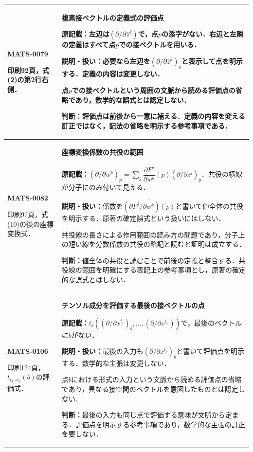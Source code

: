 \documentclass[a4paper,10pt]{ltjsarticle}
\begin{document}
\begin{longtable}{@{}>{\raggedright\arraybackslash}p{.19\linewidth}>{\raggedright\arraybackslash}p{.77\linewidth}@{}}
\hline
\hypertarget{MATS-0079}{}\textbf{MATS-0079}\par 印刷92頁，式(2)の第2行右側． & \textbf{複素接ベクトルの定義式の評価点}\par\textbf{原記載：}左辺は$\left(\partial/\partial\bar z^k\right)$で，点$p$の添字がない．右辺と左隣の定義はすべて点$p$での接ベクトルを用いる．\par\textbf{説明・扱い：}必要なら左辺を$(\partial/\partial\bar z^k)_p$と表示して点を明示する．定義の内容は変更しない．\par 点$p$での接ベクトルという周囲の文脈から読める評価点の省略であり，数学的な誤式とは認定しない．\par\textbf{判断：}評価点は前後から一意に補える．定義の内容を変える訂正ではなく，記法の省略を明示する参考事項である． \\[3pt]
\hline
\hypertarget{MATS-0082}{}\textbf{MATS-0082}\par 印刷97頁，式(10)の後の座標変換式． & \textbf{座標変換係数の共役の範囲}\par\textbf{原記載：}$(\partial/\partial\bar w^k)_p=\sum_j\dfrac{\overline{\partial F^j}}{\partial w^k}(p)(\partial/\partial\bar z^j)_p$．共役の横線が分子にのみ付いて見える．\par\textbf{説明・扱い：}係数を$\overline{(\partial F^j/\partial w^k)(p)}$と書いて値全体の共役を明示する．原著の確定誤式という扱いにはしない．\par 共役線の長さによる作用範囲の読み方の問題であり，分子上の短い線を分数係数の共役の略記と読むと証明は成立する．\par\textbf{判断：}値全体の共役と読むことで前後の定義と整合する．共役線の範囲を明確にする表記上の参考事項とし，原著の確定的な誤式とはしない． \\[3pt]
\hline
\hypertarget{MATS-0106}{}\textbf{MATS-0106}\par 印刷124頁，$t_{i_1\cdots i_p}(b)$の評価式． & \textbf{テンソル成分を評価する最後の接ベクトルの点}\par\textbf{原記載：}$t_b((\partial/\partial x^{i_1})_b,\ldots,(\partial/\partial x^{i_p}))$で，最後のベクトルに$b$がない．\par\textbf{説明・扱い：}最後の入力も$(\partial/\partial x^{i_p})_b$と書いて評価点を明示する．数学的な主張は変更しない．\par 点$b$における形式の入力という文脈から読める評価点の省略であり，異なる接空間のベクトルを意図したものとは認定しない．\par\textbf{判断：}最後の入力も同じ点で評価する意味が文脈から定まる．評価点を明示する参考事項であり，数学的な主張の訂正を要しない． \\[3pt]

\end{longtable}
\end{document}
